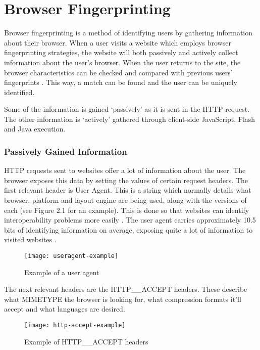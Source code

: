 \chapter{Browser Fingerprinting}

Browser fingerprinting is a method of identifying users by gathering information about their browser.
When a user visits a website which employs browser fingerprinting strategies, the website will both passively and actively collect information about the user's browser.
When the user returns to the site, the browser characteristics can be checked and compared with previous users' fingerprints \citep{fingerprinting}.
This way, a match can be found and the user can be uniquely identified.

Some of the information is gained `passively' as it is sent in the HTTP request.
The other information is `actively' gathered through client-side JavaScript, Flash and Java execution.

\subsection{Passively Gained Information}

HTTP requests sent to websites offer a lot of information about the user.
The browser exposes this data by setting the values of certain request headers.
The first relevant header is User Agent.
This is a string which normally details what browser, platform and layout engine are being used, along with the versions of each (see Figure 2.1 for an example).
This is done so that websites can identify interoperability problems more easily \citep{useragent}.
The user agent carries approximately 10.5 bits of identifying information on average, exposing quite a lot of information to visited websites \citep{useragententropy}.

\begin{figure}[h]
\caption{Example of a user agent}
\texttt{[image: useragent-example]}
\centering
\end{figure}

The next relevant headers are the HTTP\_\_ACCEPT headers.
These describe what MIMETYPE the browser is looking for, what compression formats it'll accept and what languages are desired.

\begin{figure}[h]
\caption{Example of HTTP\_\_ACCEPT headers}
\texttt{[image: http-accept-example]}
\centering
\end{figure}

